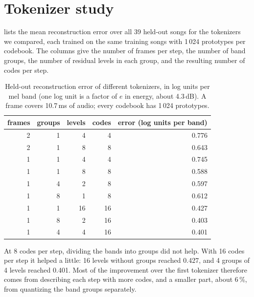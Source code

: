 \FloatBarrier
\section{Tokenizer study}
\label{sec:appendix-tokenizer}

 lists the mean reconstruction error over all 39
held-out songs for the tokenizers we compared, each trained on the same
training songs with 1\,024 prototypes per codebook. The columns give the
number of frames per step, the number of band groups, the number of residual
levels in each group, and the resulting number of codes per step.

\begin{table}[htbp]
\centering
\caption{Held-out reconstruction error of different tokenizers, in log units
per mel band (one log unit is a factor of $e$ in energy, about 4.3\,dB). A frame
covers 10.7\,ms of audio; every codebook has 1\,024 prototypes.}
\label{tab:tokenizer-study}
\small
\begin{tabular}{rrrrr}
\toprule
frames & groups & levels & codes & error (log units per band) \\
\midrule
2 & 1 & 4 & 4 & 0.776 \\
2 & 1 & 8 & 8 & 0.643 \\
1 & 1 & 4 & 4 & 0.745 \\
1 & 1 & 8 & 8 & 0.588 \\
1 & 4 & 2 & 8 & 0.597 \\
1 & 8 & 1 & 8 & 0.612 \\
1 & 1 & 16 & 16 & 0.427 \\
1 & 8 & 2 & 16 & 0.403 \\
1 & 4 & 4 & 16 & 0.401 \\
\bottomrule
\end{tabular}
\end{table}

At 8 codes per step, dividing the bands into groups did not help. With 16
codes per step it helped a little: 16 levels without groups reached 0.427,
and 4 groups of 4 levels reached 0.401. Most of the improvement over the first
tokenizer therefore comes from describing each step with more codes, and a
smaller part, about 6\,\%, from quantizing the band groups separately.

\FloatBarrier
